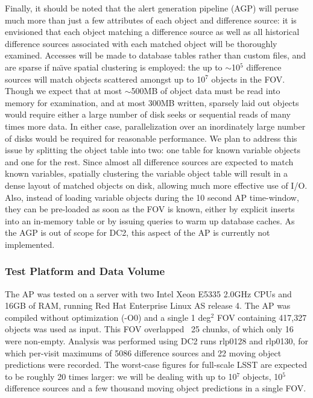 Finally, it should be noted that the alert generation pipeline (AGP) will
peruse much more than just a few attributes of each object and difference
source: it is envisioned that each object matching a difference source as
well as all historical difference sources associated with each matched object
will be thoroughly examined. Accesses will be made to database tables rather
than custom files, and are sparse if na{\"\i}ve spatial clustering is employed: the
up to \ensuremath{\sim}10$^{5}$ difference sources will match objects scattered
amongst up to 10$^{7}$ objects in the FOV. Though we expect that at most
\ensuremath{\sim}500MB of object data must be read into memory for
examination, and at most 300MB written, sparsely laid out objects would
require either a large number of disk seeks or sequential reads of many times
more data. In either case, parallelization over an inordinately large number
of disks would be required for reasonable performance. We plan to address this
issue by splitting the object table into two: one table for known variable
objects and one for the rest. Since almost all difference sources are expected
to match known variables, spatially clustering the variable object table will
result in a dense layout of matched objects on disk, allowing much more
effective use of I/O. Also, instead of loading variable objects during the 10
second AP time-window, they can be pre-loaded as soon as the FOV is known,
either by explicit inserts into an in-memory table or by issuing queries to
warm up database caches. As the AGP is out of scope for DC2, this aspect of
the AP is currently not implemented.

\subsubsection{Test Platform and Data Volume}

The AP was tested on a server with two Intel Xeon E5335 2.0GHz CPUs
and 16GB of RAM, running Red Hat Enterprise Linux AS release 4. The AP was
compiled without optimization (-O0) and a single 1 deg$^{2}$ FOV
containing 417,327 objects was used as input. This FOV overlapped ~25 chunks,
of which only 16 were non-empty. Analysis was performed using DC2 runs
rlp0128 and rlp0130, for which per-visit maximums of 5086 difference
sources and 22 moving object predictions were recorded. The worst-case figures
for full-scale LSST are expected to be roughly 20 times larger: we will be
dealing with up to 10$^{7}$ objects, 10$^{5}$ difference sources and a few
thousand moving object predictions in a single FOV.


